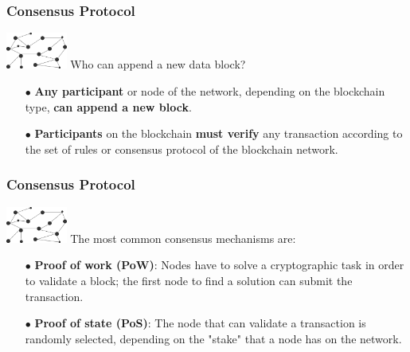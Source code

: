 \documentclass{beamer}
\begin{document}
\begin{frame}
	\frametitle{Consensus Protocol}
	\includegraphics[width=0.15\textwidth,right]{bc}
	Who can append a new data block?\linebreak
		\begin{itemize}
		\item[$\bullet$] \textbf{Any participant} or node of the network, depending on the blockchain type, \textbf{can append a new block}.\linebreak
		\item[$\bullet$] \textbf{Participants} on the blockchain \textbf{must verify} any transaction according to the set of rules or consensus protocol of the blockchain network.
	\end{itemize}				
\end{frame}

\begin{frame}
	\frametitle{Consensus Protocol}
	\includegraphics[width=0.15\textwidth,right]{bc}
	The most common consensus mechanisms are:\linebreak
	\begin{itemize}
		\item[$\bullet$] \textbf{Proof of work (PoW)}: Nodes have to solve a cryptographic task in order to
		validate a block; the first node to find a solution can submit the transaction.
		\linebreak
		\item[$\bullet$] \textbf{Proof of state (PoS)}: The node that can validate a transaction is randomly
		selected, depending on the "stake" that a node has on the network.
	\end{itemize}	
	
\end{frame}
\end{document}
